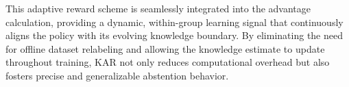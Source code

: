 \documentclass{article} %
\newcommand{\rewardname}{\textsc{KAR}}
\begin{document}
This adaptive reward scheme is seamlessly integrated into the advantage calculation, providing a dynamic, within-group learning signal that continuously aligns the policy with its evolving knowledge boundary. By eliminating the need for offline dataset relabeling and allowing the knowledge estimate to update throughout training, \rewardname{} not only reduces computational overhead but also fosters precise and generalizable abstention behavior.




\end{document}

